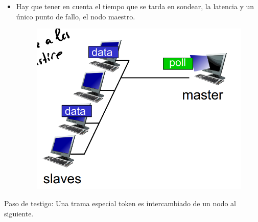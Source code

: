 \documentclass[12pt, twoside, openright]{report} %
\begin{document}
        \begin{itemize}
        \item
          Hay que tener en cuenta el tiempo que se tarda en sondear, la
          latencia y un único punto de fallo, el nodo maestro.
          \begin{figure}[H]
            {\includegraphics[scale=.25]{Untitled 55.png}}
          \end{figure}
        \end{itemize}
\pagebreak
        Paso de testigo: Una trama especial token es intercambiado de un
        nodo al siguiente.
\end{document}
